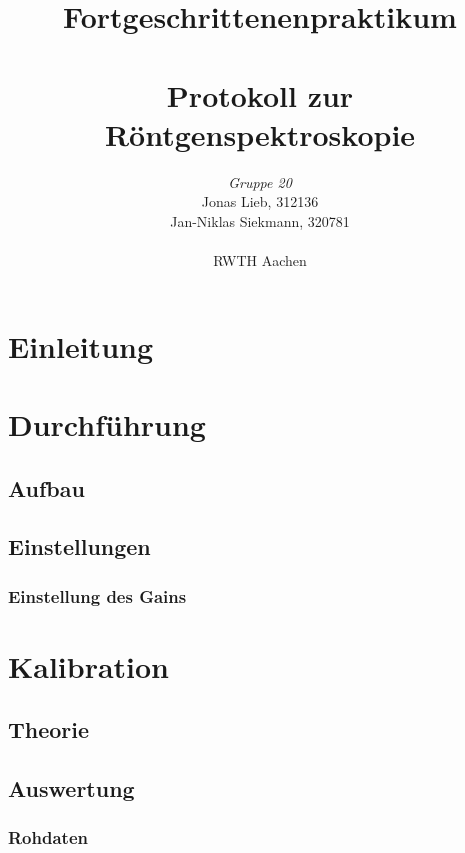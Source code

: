 \documentclass{../Misc/MontavonLaTeX/Montavon}
\begin{document}
\title{Fortgeschrittenenpraktikum \\ \quad \\ Protokoll zur Röntgenspektroskopie }
\author{\emph{Gruppe 20} \\  Jonas Lieb, 312136 \\ Jan-Niklas Siekmann, 320781 \\ \ \\  RWTH Aachen}
\maketitle
\newpage

\tableofcontents
\newpage

\section{Einleitung}


\section{Durchführung}
\subsection{Aufbau}

\subsection{Einstellungen}

\subsubsection{Einstellung des Gains}


\section{Kalibration}
\subsection{Theorie}

\subsection{Auswertung}
\subsubsection{Rohdaten}
\end{document}
